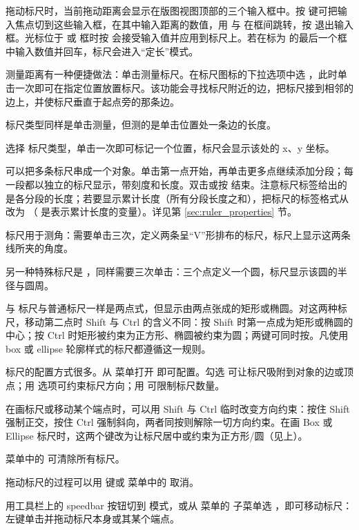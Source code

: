 拖动标尺时，当前拖动距离会显示在版图视图顶部的三个输入框中。按  键可把输入焦点切到这些输入框，在其中输入距离的数值，用  与  在框间跳转，按  退出输入框。光标位于  或  框时按  会接受输入值并应用到标尺上。若在标为  的最后一个框中输入数值并回车，标尺会进入“定长”模式。

测量距离有一种便捷做法：单击测量标尺。在标尺图标的下拉选项中选 ，此时单击一次即可在指定位置放置标尺。该功能会寻找标尺附近的边，把标尺接到相邻的边上，并使标尺垂直于起点旁的那条边。

 标尺类型同样是单击测量，但测的是单击位置处一条边的长度。

选择  标尺类型，单击一次即可标记一个位置，标尺会显示该处的 x、y 坐标。

 可以把多条标尺串成一个对象。单击第一点开始，再单击更多点继续添加分段；每一段都以独立的标尺显示，带刻度和长度。双击或按  结束。注意标尺标签给出的是各分段的长度；若要显示累计长度（所有分段长度之和），把标尺的标签格式从  改为 （ 是表示累计长度的变量）。详见第 \ref{sec:ruler_properties} 节。

 标尺用于测角：需要单击三次，定义两条呈“V”形排布的标尺，标尺上显示这两条线所夹的角度。

另一种特殊标尺是 ，同样需要三次单击：三个点定义一个圆，标尺显示该圆的半径与圆周。

 与  标尺与普通标尺一样是两点式，但显示由两点张成的矩形或椭圆。对这两种标尺，移动第二点时 Shift 与 Ctrl 的含义不同：按 Shift 时第一点成为矩形或椭圆的中心；按 Ctrl 时矩形被约束为正方形、椭圆被约束为圆；两键可同时按。凡使用 box 或 ellipse 轮廓样式的标尺都遵循这一规则。

标尺的配置方式很多。从  菜单打开  即可配置。勾选  可让标尺吸附到对象的边或顶点；用  选项可约束标尺方向；用  可限制标尺数量。

在画标尺或移动某个端点时，可以用 Shift 与 Ctrl 临时改变方向约束：按住 Shift 强制正交，按住 Ctrl 强制斜向，两者同按则解除一切方向约束。在画 Box 或 Ellipse 标尺时，这两个键改为让标尺居中或约束为正方形/圆（见上）。

 菜单中的  可清除所有标尺。

拖动标尺的过程可以用  键或  菜单中的  取消。

用工具栏上的 speedbar 按钮切到  模式，或从  菜单的  子菜单选 ，即可移动标尺：左键单击并拖动标尺本身或其某个端点。

